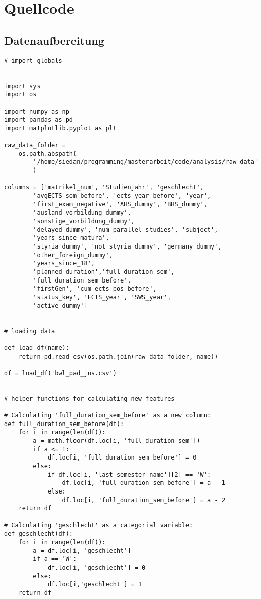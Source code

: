 
\chapter{Quellcode}
\label{sec:quellcode}

\section{Datenaufbereitung}
\begin{lstlisting}
# import globals


import sys
import os

import numpy as np
import pandas as pd
import matplotlib.pyplot as plt

raw_data_folder =
    os.path.abspath(
        '/home/siedan/programming/masterarbeit/code/analysis/raw_data'
        )

columns = ['matrikel_num', 'Studienjahr', 'geschlecht',
        'avgECTS_sem_before', 'ects_year_before', 'year',
        'first_exam_negative', 'AHS_dummy', 'BHS_dummy', 
        'ausland_vorbildung_dummy',
        'sonstige_vorbildung_dummy',
        'delayed_dummy', 'num_parallel_studies', 'subject',
        'years_since_matura',
        'styria_dummy', 'not_styria_dummy', 'germany_dummy',
        'other_foreign_dummy',
        'years_since_18',
        'planned_duration','full_duration_sem',
        'full_duration_sem_before',
        'firstGen', 'cum_ects_pos_before',
        'status_key', 'ECTS_year', 'SWS_year',
        'active_dummy']


# loading data

def load_df(name):
    return pd.read_csv(os.path.join(raw_data_folder, name))

df = load_df('bwl_pad_jus.csv')


# helper functions for calculating new features

# Calculating 'full_duration_sem_before' as a new column:
def full_duration_sem_before(df):
    for i in range(len(df)):
        a = math.floor(df.loc[i, 'full_duration_sem'])
        if a <= 1:
            df.loc[i, 'full_duration_sem_before'] = 0
        else:
            if df.loc[i, 'last_semester_name'][2] == 'W':
                df.loc[i, 'full_duration_sem_before'] = a - 1
            else:
                df.loc[i, 'full_duration_sem_before'] = a - 2
    return df

# Calculating 'geschlecht' as a categorial variable:
def geschlecht(df):
    for i in range(len(df)):
        a = df.loc[i, 'geschlecht']
        if a == 'W':
            df.loc[i, 'geschlecht'] = 0
        else:
            df.loc[i,'geschlecht'] = 1
    return df


\end{lstlisting}
